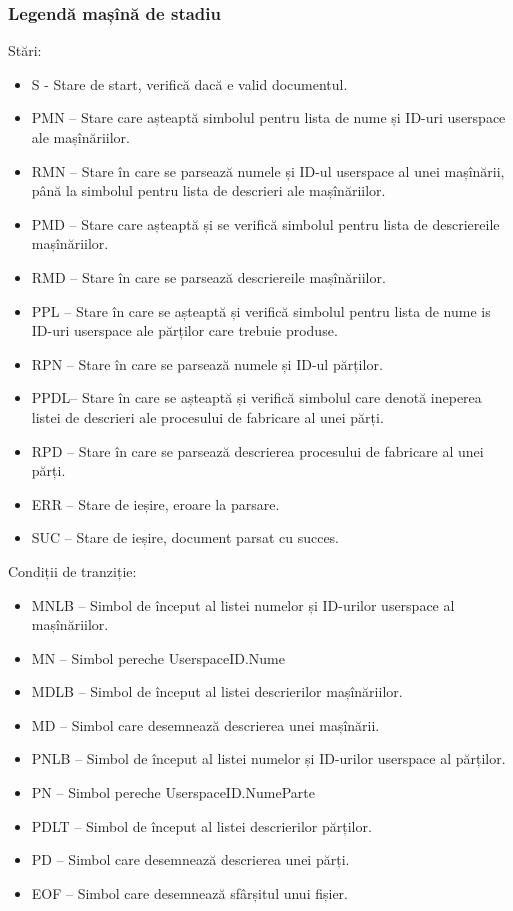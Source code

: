 \documentclass[12pt, twoside]{article}
\begin{document}
\subsubsection{Legendă mașînă de stadiu}
Stări:
\begin{itemize}
  \item S - Stare de start, verifică dacă e valid documentul.
  \item PMN -- Stare care așteaptă simbolul pentru
              lista de nume și ID-uri userspace
              ale mașînăriilor.
  \item RMN -- Stare în care se parsează numele și ID-ul
              userspace al unei mașînării, până la simbolul
              pentru lista de descrieri ale mașînăriilor.
  \item PMD -- Stare care așteaptă și se verifică simbolul 
              pentru lista de descriereile mașînăriilor.
  \item RMD -- Stare în care se parsează descriereile mașînăriilor.
  \item PPL -- Stare în care se așteaptă și verifică simbolul pentru
              lista de nume is ID-uri userspace ale părților
              care trebuie produse.
  \item RPN -- Stare în care se parsează numele și ID-ul părților.
  \item PPDL-- Stare în care se așteaptă și verifică simbolul
                care denotă ineperea listei de descrieri ale procesului
                de fabricare al unei părți.
  \item RPD -- Stare în care se parsează descrierea procesului de
              fabricare al unei părți.
  \item ERR -- Stare de ieșire, eroare la parsare.
  \item SUC -- Stare de ieșire, document parsat cu succes.
\end{itemize}
Condiții de tranziție:
\begin{itemize}
  \item MNLB -- Simbol de început al listei numelor și ID-urilor userspace al mașînăriilor.
  \item MN -- Simbol pereche UserspaceID.Nume
  \item MDLB -- Simbol de început al listei descrierilor mașînăriilor.
  \item MD -- Simbol care desemnează descrierea unei mașînării.
  \item PNLB -- Simbol de început al listei numelor și ID-urilor userspace al părților.
  \item PN -- Simbol pereche UserspaceID.NumeParte
  \item PDLT -- Simbol de început al listei descrierilor părților.
  \item PD -- Simbol care desemnează descrierea unei părți.
  \item EOF -- Simbol care desemnează sfârșitul unui fișier.
\end{itemize}
\end{document}
